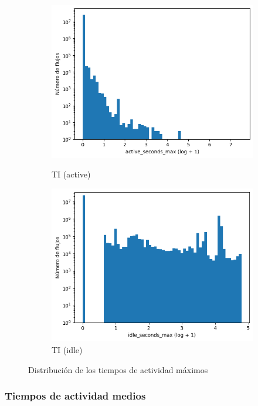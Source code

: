 \begin{figure}[H]
\begin{subfigure}[b]{0.26\textwidth}
        \includegraphics[width=\linewidth]{media/packet_pincer_toniot/active_seconds_max_log_x_log_y.png}
        \caption{TI (active)}
        \includegraphics[width=\linewidth]{media/packet_pincer_toniot/idle_seconds_max_log_x_log_y.png}
        \caption{TI (idle)}
    \end{subfigure}
       \caption{Distribución de los tiempos de actividad máximos}
       \label{fig:packet_pincer_active_seconds_max}
\end{figure}

\subsubsection{Tiempos de actividad medios}

